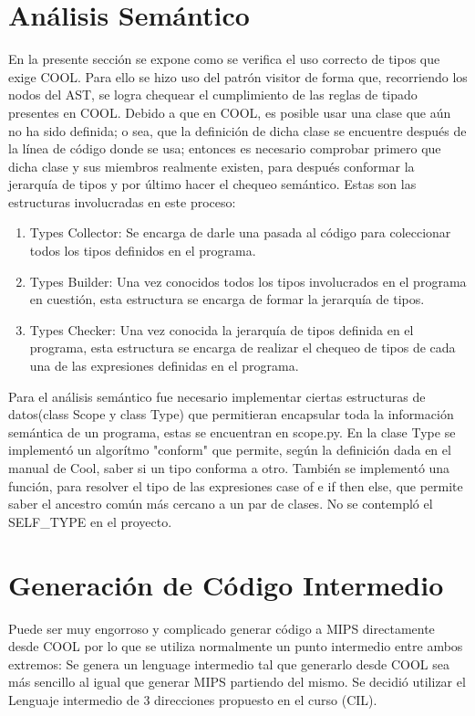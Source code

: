 \documentclass[]{article}
\begin{document}
\section{An\'alisis Sem\'antico}
En la presente secci\'on se expone como se verifica el uso correcto de tipos que
exige COOL. Para ello se hizo uso del patr\'on visitor de forma que, recorriendo
los nodos del AST, se logra chequear el cumplimiento de las reglas de tipado
presentes en COOL. Debido a que en COOL, es posible
usar una clase que a\'un no ha sido definida; o sea, que la definici\'on de dicha clase se
encuentre despu\'es de la l\'inea de c\'odigo donde se usa; entonces es necesario comprobar
primero que dicha clase y sus miembros realmente existen, para despu\'es conformar la
jerarqu\'ia de tipos y por \'ultimo hacer el chequeo sem\'antico. Estas son las estructuras
involucradas en este proceso:
\begin{enumerate}
	\item Types Collector: Se encarga de darle una pasada al c\'odigo para coleccionar todos
	los tipos definidos en el programa.
	\item Types Builder: Una vez conocidos todos los tipos involucrados en el programa en
	cuesti\'on, esta estructura se encarga de formar la jerarqu\'ia de tipos.
	\item Types Checker: Una vez conocida la jerarqu\'ia de tipos definida en el programa,
	esta estructura se encarga de realizar el chequeo de tipos de cada una de las
	expresiones definidas en el programa.
\end{enumerate}
Para el an\'alisis sem\'antico fue necesario implementar ciertas estructuras de datos(class Scope y class Type) que permitieran encapsular toda la informaci\'on sem\'antica de un programa, estas se encuentran en scope.py.
En la clase Type se implement\'o un algor\'itmo "conform" que permite, seg\'un la definici\'on dada en el manual de Cool, saber si un tipo conforma a otro. Tambi\'en se implement\'o una funci\'on, para resolver el tipo de las expresiones case of e if then else, que permite saber el ancestro com\'un m\'as cercano a un par de clases.
No se contempl\'o el SELF\_TYPE en el proyecto.

\section{Generaci\'on de C\'odigo Intermedio}
Puede ser muy engorroso y complicado generar c\'odigo a MIPS directamente desde COOL por lo que se utiliza normalmente un punto intermedio entre ambos extremos: Se genera un lenguage intermedio tal que generarlo desde COOL sea m\'as sencillo al igual que generar MIPS partiendo del mismo. Se decidi\'o utilizar el Lenguaje intermedio de 3 direcciones propuesto en el curso (CIL).
\end{document}
